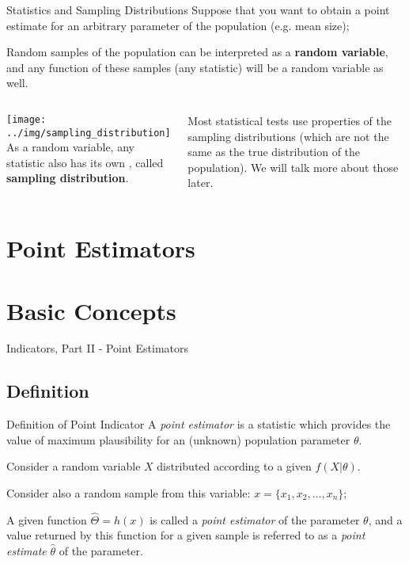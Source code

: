 \begin{frame}{Statistics and Sampling Distributions}
  Suppose that you want to obtain a point estimate for an arbitrary parameter of the population (e.g. mean size);\medskip

  Random samples of the population can be interpreted as a {\bf random variable}, and any function of these samples (any statistic) will
  be a random variable as well.\medskip

  \begin{columns}
      \texttt{[image: ../img/sampling\_distribution]}
      As a random variable, any statistic also has its own , called {\bf sampling distribution}.\bigskip

      Most statistical tests use properties of the sampling distributions (which are not the same as the true distribution of the population). We will talk more about those later.
  \end{columns}

\end{frame}

\section{Point Estimators}
\section{Basic Concepts}
\begin{frame}
  \begin{center}
    Indicators, Part II - Point Estimators
  \end{center}
\end{frame}

\subsection{Definition}
\begin{frame}{Definition of Point Indicator}
  A \emph{point estimator} is a statistic which provides the value of maximum plausibility for an (unknown) population parameter $\theta$.
  \bigskip

  Consider a random variable $X$ distributed according to a given $f(X|\theta)$.\bigskip

  Consider also a random sample from this variable: $x=\{x_1,x_2,\ldots,x_n\}$;\bigskip

  A given function $\hat{\Theta}=h\left(x\right)$ is called a \emph{point estimator} of the parameter $\theta$, and a value returned by this function for a given sample is referred to as a \emph{point estimate} $\hat{\theta}$ of the parameter.
\end{frame}

